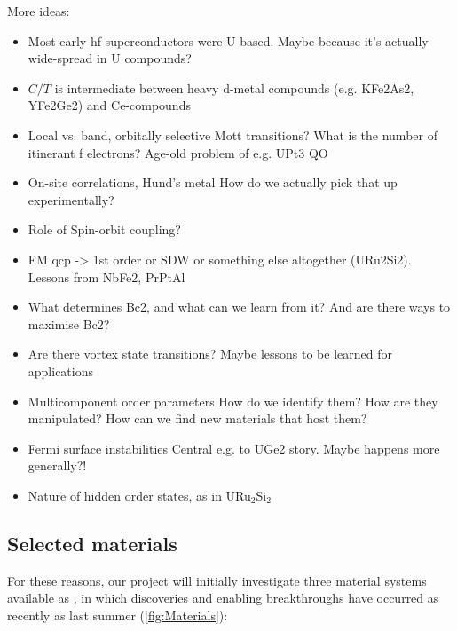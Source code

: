 More ideas: \\
\begin{itemize}
  \item Most early hf superconductors were U-based. Maybe because it's actually wide-spread in U compounds? 

\item $C/T$ is intermediate between heavy d-metal compounds (e.g. KFe2As2, YFe2Ge2) and Ce-compounds

\item
Local vs. band, orbitally selective Mott transitions? What is the number of itinerant f electrons? 
Age-old problem of e.g. UPt3 QO

\item 
On-site correlations, Hund's metal 
How do we actually pick that up experimentally?

\item
Role of Spin-orbit coupling?

\item 
FM qcp -> 1st order or SDW or something else altogether (URu2Si2). 
Lessons from NbFe2, PrPtAl

\item 
What determines Bc2, and what can we learn from it? 
And are there ways to maximise Bc2?

\item 
Are there vortex state transitions?
Maybe lessons to be learned for applications

\item 
Multicomponent order parameters
How do we identify them? How are they manipulated? How can we find new materials that host them?

\item 
Fermi surface instabilities
Central e.g. to UGe2 story. Maybe happens more generally?!

\item Nature of hidden order states, as in URu$_2$Si$_2$

\end{itemize}

\subsection*{Selected materials}
\noindent
For these reasons, our project will initially investigate three material systems available as , in which discoveries and enabling breakthroughs %
have occurred as recently as last summer (\autoref{fig:Materials}):

